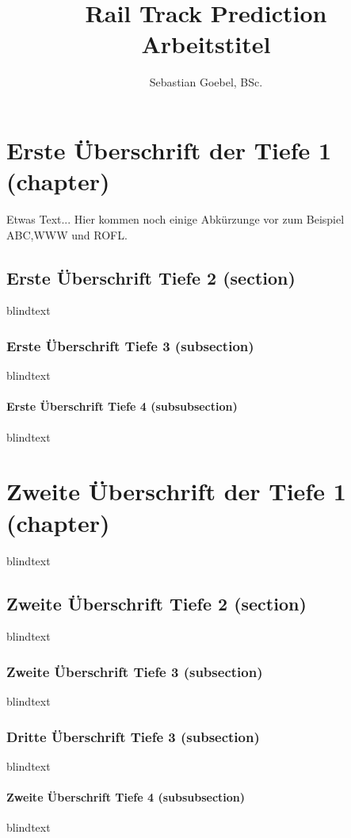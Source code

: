 \documentclass[Master,BMR,english]{BASE/twbook}
\title{Rail Track Prediction\\Arbeitstitel}
\author{Sebastian Goebel, BSc.}
\begin{document}
\maketitle
\chapter{Erste Überschrift der Tiefe 1 (chapter)}

Etwas Text... Hier kommen noch einige Abkürzunge vor zum Beispiel \ac{ABC},\ac{WWW} und \ac{ROFL}.

\section{Erste Überschrift Tiefe 2 (section)}
blindtext

\subsection{Erste Überschrift Tiefe 3 (subsection)}
blindtext

\subsubsection{Erste Überschrift Tiefe 4 (subsubsection)}
blindtext

\chapter{Zweite Überschrift der Tiefe 1 (chapter)}
blindtext

\section{Zweite Überschrift Tiefe 2 (section)}
blindtext

\subsection{Zweite Überschrift Tiefe 3 (subsection)}
blindtext

\subsection{Dritte Überschrift Tiefe 3 (subsection)}
blindtext

\subsubsection{Zweite Überschrift Tiefe 4 (subsubsection)}
blindtext
\end{document}
